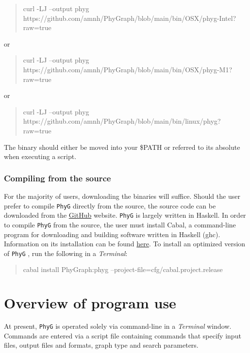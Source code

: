 \documentclass[11pt]{book}
\newcommand{\phyg}{\texttt{PhyG} }
\begin{document}
{{		\begin {quote}
		curl -LJ --output phyg https://github.com/amnh/PhyGraph/blob/main/bin/OSX/phyg-Intel?raw=true
		\end{quote}		
		
		\noindent or 
		
		\begin {quote}
		curl -LJ --output phyg https://github.com/amnh/PhyGraph/blob/main/bin/OSX/phyg-M1?raw=true
		\end{quote}	
		
		\noindent or 
		
		\begin {quote}
		curl -LJ --output phyg https://github.com/amnh/PhyGraph/blob/main/bin/linux/phyg?
		raw=true
		\end{quote}
		
		\noindent The binary should either be moved into your \$PATH or referred to its 
		absolute when executing a script.
				
		\subsubsection{Compiling from the source}
		For the majority of users, downloading the binaries will suffice. Should the user prefer to 
		compile \phyg directly from the source, the source code can be downloaded 
		from the \href{https://github.com/amnh/PhyGraph}{GitHub} website. \phyg is largely 
		written in Haskell. In order to compile \phyg from the source, the user must install Cabal, 
		a command-line program for downloading and building software written in Haskell (ghc).  
		Information on its installation can be found  
		\href{https://www.schoolofhaskell.com/user/simonmichael/how-to-cabal-install}{here}.
		To install an optimized version of \phyg, run the following in a \textit{Terminal}:
		
		\begin{quote}
		cabal install PhyGraph:phyg --project-file=cfg/cabal.project.release
		\end{quote}
		
		
	\section{Overview of program use}
	
		At present, \phyg is operated solely via command-line in a \textit{Terminal} window. 
		Commands are entered via a script file containing commands that specify input files, 
		output files and formats, graph type and search parameters.
		
}}
\end{document}
